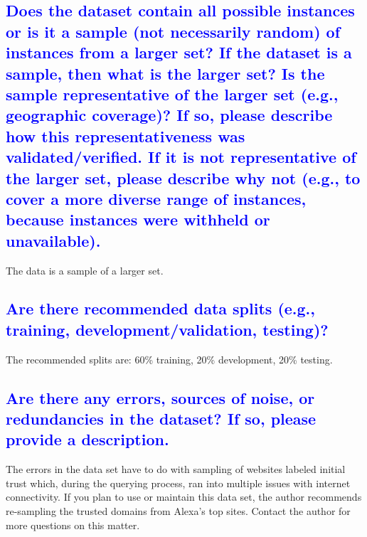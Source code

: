 \documentclass[letterpaper, 10 pt, conference]{ieeeconf}  %
\begin{document}
\textcolor{blue}{\subsection{Does the dataset contain all possible instances or is it a sample (not
necessarily random) of instances from a larger set? If the dataset is
a sample, then what is the larger set? Is the sample representative of the
larger set (e.g., geographic coverage)? If so, please describe how this
representativeness was validated/verified. If it is not representative of the
larger set, please describe why not (e.g., to cover a more diverse range of
instances, because instances were withheld or unavailable).}}
The data is a sample of a larger set.

\textcolor{blue}{\subsection{Are there recommended data splits (e.g., training, development/validation, testing)?}}

The recommended splits are: 60\% training, 20\% development, 20\% testing.

\textcolor{blue}{\subsection{Are there any errors, sources of noise, or redundancies in the
dataset? If so, please provide a description.}}
The errors in the data set have to do with sampling of websites labeled initial trust which, during the querying process, ran into multiple issues with internet connectivity. If you plan to use or maintain this data set, the author recommends re-sampling the trusted domains from Alexa's top sites. Contact the author for more questions on this matter.
\end{document}
